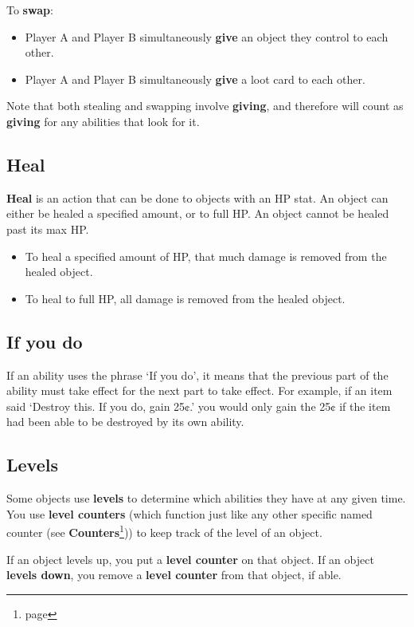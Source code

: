 \documentclass[10pt, a4paper, twoside]{article} %
\begin{document}
    To \textbf{swap}:
    \begin{itemize}
        \item Player A and Player B simultaneously \textbf{give} an object they control to each other.
        \item Player A and Player B simultaneously \textbf{give} a loot card to each other.
    \end{itemize}
    
    Note that both stealing and swapping involve \textbf{giving}, and therefore will count as \textbf{giving} for any abilities that look for it.
    \subsection{Heal}
    \textbf{Heal} is an action that can be done to objects with an HP stat. An object can either be healed a specified amount, or to full HP. An object cannot be healed past its max HP.

    \begin{itemize}
        \item To heal a specified amount of HP, that much damage is removed from the healed object. 
        \item To heal to full HP, all damage is removed from the healed object.
    \end{itemize}
    \subsection{If you do}
    If an ability uses the phrase ‘If you do’, it means that the previous part of the ability must take effect for the next part to take effect. For example, if an item said ‘Destroy this. If you do, gain 25¢.’ you would only gain the 25¢ if the item had been able to be destroyed by its own ability.
    \subsection{Levels}
    Some objects use \textbf{levels} to determine which abilities they have at any given time. You use \textbf{level counters} (which function just like any other specific named counter (see \textbf{Counters}\footnote{page \pageref{counters}})) to keep track of the level of an object.

    If an object levels up, you put a \textbf{level counter} on that object. If an object \textbf{levels down}, you remove a \textbf{level counter} from that object, if able.
\end{document}
